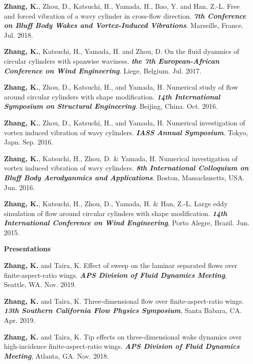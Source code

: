 \documentclass[10pt]{article}
\begin{document}
{\begin{etaremune}
\item \textbf{Zhang, K.}, Zhou, D., Katsuchi, H., Yamada, H., Bao, Y. and Han, Z.-L. Free and forced vibration of a wavy cylinder in cross-flow direction. \textit{\textbf{7th Conference on Bluff Body Wakes and Vortex-Induced Vibrations}}. Marseille, France. Jul. 2018.

\item \textbf{Zhang, K.}, Katsuchi, H., Yamada, H. and Zhou, D. On the fluid dyanmics of circular cylinders with spanwise waviness. \textit{\textbf{the 7th European-African Conference on Wind Engineering}}. Liege, Belgium. Jul. 2017.

\item \textbf{Zhang, K.}, Zhou, D., Katsuchi, H., and Yamada, H. Numerical study of flow around circular cylinders with shape modification. \textit{\textbf{14th International Symposium on Structural Engineering}}. Beijing, China. Oct. 2016.

\item \textbf{Zhang, K.}, Zhou, D., Katsuchi, H., and Yamada, H. Numerical investigation of vortex induced vibration of wavy cylinders. \textit{\textbf{IASS Annual Symposium}}. Tokyo, Japn. Sep. 2016.

\item \textbf{Zhang, K.}, Katsuchi, H., Zhou, D. \& Yamada, H. Numerical investigation of vortex induced vibration of wavy cylinders. \textit{\textbf{8th International Colloquium on Bluff Body Aerodyanmics and Applications}}. Boston, Massachusetts, USA. Jun. 2016.

\item \textbf{Zhang, K.}, Katsuchi, H., Zhou, D., Yamada, H. \& Han, Z.-L. Large eddy simulation of flow around circular cylinders with shape modification. \textit{\textbf{14th International Conference on Wind Engineering}}, Porto Alegre, Brazil. Jun. 2015.

\end{etaremune}

}

{\bf \color{Blue}Presentations} 

{\small
\begin{etaremune}

\item \textbf{Zhang, K.} and Taira, K. Effect of sweep on the laminar separated flows over finite-aspect-ratio wings. \textit{\textbf{APS Division of Fluid Dynamics Meeting}}, Seattle, WA. Nov. 2019.

\item \textbf{Zhang, K.} and Taira, K. Three-dimensional flow over finite-aspect-ratio wings. \textit{\textbf{13th Southern California Flow Physics Symposium}}, Santa Babara, CA. Apr. 2019.

\item \textbf{Zhang, K.} and Taira, K. Tip effects on three-dimensional wake dynamics over high-incidence finite-aspect-ratio wings. \textit{\textbf{APS Division of Fluid Dynamics Meeting}}, Atlanta, GA. Nov. 2018.

\end{etaremune}
}
\end{document}
